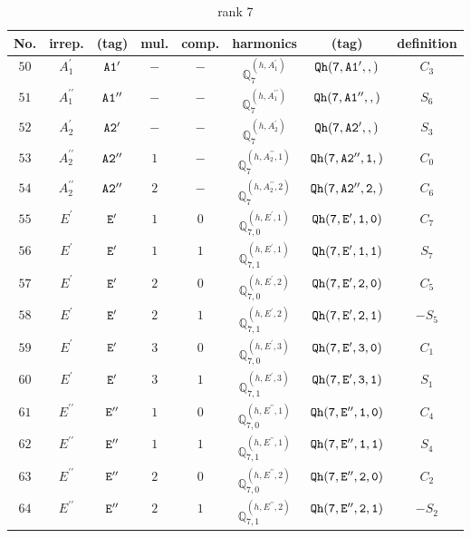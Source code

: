 \documentclass[fleqn,8pt]{jsarticle}
\begin{document}
\begin{table}[ht!]
\begin{center}
\caption{rank 7}
\renewcommand{\arraystretch}{1.3}
\begin{tabular}{cccccccc} \hline \hline
No. & irrep. & (tag) & mul. & comp. & harmonics & (tag) & definition \\ \hline
$ 50 $ & $ A_{1}^{\prime} $ & $ {\tt A1'} $ & $ - $ & $ - $ & $ \mathbb{Q}_{7}^{(h,A_{1}^{\prime})} $ & $ {\tt Qh(7,A1',,)} $ & $ C_{3} $ \\
$ 51 $ & $ A_{1}^{\prime\prime} $ & $ {\tt A1''} $ & $ - $ & $ - $ & $ \mathbb{Q}_{7}^{(h,A_{1}^{\prime\prime})} $ & $ {\tt Qh(7,A1'',,)} $ & $ S_{6} $ \\
$ 52 $ & $ A_{2}^{\prime} $ & $ {\tt A2'} $ & $ - $ & $ - $ & $ \mathbb{Q}_{7}^{(h,A_{2}^{\prime})} $ & $ {\tt Qh(7,A2',,)} $ & $ S_{3} $ \\
$ 53 $ & $ A_{2}^{\prime\prime} $ & $ {\tt A2''} $ & $ 1 $ & $ - $ & $ \mathbb{Q}_{7}^{(h,A_{2}^{\prime\prime},1)} $ & $ {\tt Qh(7,A2'',1,)} $ & $ C_{0} $ \\
$ 54 $ & $ A_{2}^{\prime\prime} $ & $ {\tt A2''} $ & $ 2 $ & $ - $ & $ \mathbb{Q}_{7}^{(h,A_{2}^{\prime\prime},2)} $ & $ {\tt Qh(7,A2'',2,)} $ & $ C_{6} $ \\
$ 55 $ & $ E^{\prime} $ & $ {\tt E'} $ & $ 1 $ & $ 0 $ & $ \mathbb{Q}_{7,0}^{(h,E^{\prime},1)} $ & $ {\tt Qh(7,E',1,0)} $ & $ C_{7} $ \\
$ 56 $ & $ E^{\prime} $ & $ {\tt E'} $ & $ 1 $ & $ 1 $ & $ \mathbb{Q}_{7,1}^{(h,E^{\prime},1)} $ & $ {\tt Qh(7,E',1,1)} $ & $ S_{7} $ \\
$ 57 $ & $ E^{\prime} $ & $ {\tt E'} $ & $ 2 $ & $ 0 $ & $ \mathbb{Q}_{7,0}^{(h,E^{\prime},2)} $ & $ {\tt Qh(7,E',2,0)} $ & $ C_{5} $ \\
$ 58 $ & $ E^{\prime} $ & $ {\tt E'} $ & $ 2 $ & $ 1 $ & $ \mathbb{Q}_{7,1}^{(h,E^{\prime},2)} $ & $ {\tt Qh(7,E',2,1)} $ & $ - S_{5} $ \\
$ 59 $ & $ E^{\prime} $ & $ {\tt E'} $ & $ 3 $ & $ 0 $ & $ \mathbb{Q}_{7,0}^{(h,E^{\prime},3)} $ & $ {\tt Qh(7,E',3,0)} $ & $ C_{1} $ \\
$ 60 $ & $ E^{\prime} $ & $ {\tt E'} $ & $ 3 $ & $ 1 $ & $ \mathbb{Q}_{7,1}^{(h,E^{\prime},3)} $ & $ {\tt Qh(7,E',3,1)} $ & $ S_{1} $ \\
$ 61 $ & $ E^{\prime\prime} $ & $ {\tt E''} $ & $ 1 $ & $ 0 $ & $ \mathbb{Q}_{7,0}^{(h,E^{\prime\prime},1)} $ & $ {\tt Qh(7,E'',1,0)} $ & $ C_{4} $ \\
$ 62 $ & $ E^{\prime\prime} $ & $ {\tt E''} $ & $ 1 $ & $ 1 $ & $ \mathbb{Q}_{7,1}^{(h,E^{\prime\prime},1)} $ & $ {\tt Qh(7,E'',1,1)} $ & $ S_{4} $ \\
$ 63 $ & $ E^{\prime\prime} $ & $ {\tt E''} $ & $ 2 $ & $ 0 $ & $ \mathbb{Q}_{7,0}^{(h,E^{\prime\prime},2)} $ & $ {\tt Qh(7,E'',2,0)} $ & $ C_{2} $ \\
$ 64 $ & $ E^{\prime\prime} $ & $ {\tt E''} $ & $ 2 $ & $ 1 $ & $ \mathbb{Q}_{7,1}^{(h,E^{\prime\prime},2)} $ & $ {\tt Qh(7,E'',2,1)} $ & $ - S_{2} $ \\
 \hline \hline
\end{tabular}
\end{center}
\end{table}
\end{document}
